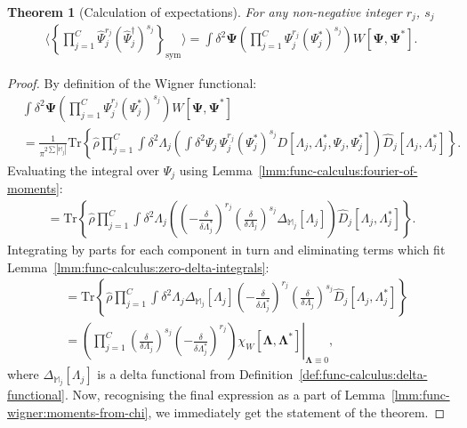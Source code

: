 \documentclass[12pt,aip,jmp,amssymb,amsmath]{revtex4-1}
\newtheorem{theorem}{Theorem}
\begin{document}
\begin{theorem}[Calculation of expectations]
\label{thm:func-wigner:moments}
    For any non-negative integer $r_j$, $s_j$
    \begin{eqnarray*}
        \langle \left\{ \prod_{j=1}^C \hat{\Psi}_j^{r_j} (\hat{\Psi}_j^\dagger)^{s_j} \right\}_{\mathrm{sym}} \rangle
        = \int \delta^2 \boldsymbol{\Psi}
            \left( \prod_{j=1}^C \Psi_j^{r_j} (\Psi_j^*)^{s_j} \right) W[\boldsymbol{\Psi}, \boldsymbol{\Psi}^*].
    \end{eqnarray*}
\end{theorem}
\begin{proof}
By definition of the Wigner functional:
\begin{eqnarray}
    & \int \delta^2\boldsymbol{\Psi} \left( \prod_{j=1}^C \Psi_j^{r_j} (\Psi_j^*)^{s_j} \right) W[\boldsymbol{\Psi}, \boldsymbol{\Psi}^*] \\
    & = \frac{1}{\pi^{2\sum|\mathbb{M}_j|}} \mathrm{Tr} \left\{ \hat{\rho}
        \prod_{j=1}^C
            \int \delta^2 \Lambda_j \left(
                \int \delta^2 \Psi_j\, \Psi_j^{r_j} (\Psi_j^*)^{s_j}
                D[\Lambda_j, \Lambda_j^*, \Psi_j, \Psi_j^*]
            \right)
            \hat{D}_j[\Lambda_j, \Lambda_j^*]
    \right\}.
\end{eqnarray}
Evaluating the integral over $\Psi_j$ using Lemma~\ref{lmm:func-calculus:fourier-of-moments}:
\begin{eqnarray}
    = \mathrm{Tr} \left\{ \hat{\rho}
        \prod_{j=1}^C
            \int \delta^2 \Lambda_j \left(
                \left( -\frac{\delta}{\delta \Lambda_j^*} \right)^{r_j}
                \left( \frac{\delta}{\delta \Lambda_j} \right)^{s_j}
                \Delta_{\mathbb{M}_j}[\Lambda_j]
            \right)
            \hat{D}_j[\Lambda_j, \Lambda_j^*]
    \right\}.
\end{eqnarray}
Integrating by parts for each component in turn and eliminating terms which fit Lemma~\ref{lmm:func-calculus:zero-delta-integrals}:
\begin{eqnarray}
    & = \mathrm{Tr} \left\{ \hat{\rho}
        \prod_{j=1}^C \int \delta^2 \Lambda_j
            \Delta_{\mathbb{M}_j}[\Lambda_j]
            \left( -\frac{\delta}{\delta \Lambda_j^*} \right)^{r_j}
            \left( \frac{\delta}{\delta \Lambda_j} \right)^{s_j}
            \hat{D}_j[\Lambda_j, \Lambda_j^*]
    \right\} \\
    & = \left.
        \left(
            \prod_{j=1}^C
            \left( \frac{\delta}{\delta \Lambda_j} \right)^{s_j}
            \left( -\frac{\delta}{\delta \Lambda_j^*} \right)^{r_j}
        \right)
        \chi_W [\boldsymbol{\Lambda}, \boldsymbol{\Lambda}^*]
    \right|_{\boldsymbol{\Lambda} \equiv 0},
\end{eqnarray}
where $\Delta_{\mathbb{M}_j}[\Lambda_j]$ is a delta functional from Definition~\ref{def:func-calculus:delta-functional}.
Now, recognising the final expression as a part of Lemma~\ref{lmm:func-wigner:moments-from-chi},
we immediately get the statement of the theorem.
\end{proof}
\end{document}
